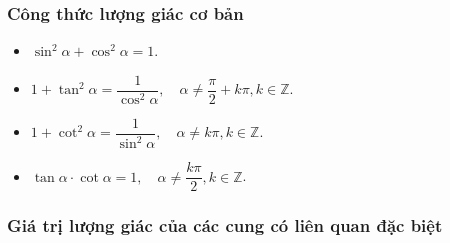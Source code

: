 \subsubsection{Công thức lượng giác cơ bản}
\begin{itemize}
\item $\sin ^2 \alpha + \cos^2 \alpha = 1$.
\item $1+\tan^2 \alpha = \dfrac{1}{\cos^2 \alpha}, \quad \alpha \neq \dfrac{\pi}{2}+k\pi, k \in \mathbb{Z}$.
\item $1+\cot^2 \alpha = \dfrac{1}{\sin^2 \alpha}, \quad \alpha \neq k\pi, k \in \mathbb{Z}$.
\item $\tan \alpha \cdot \cot \alpha = 1, \quad \alpha \neq \dfrac{k\pi}{2}, k \in \mathbb{Z}$.
\end{itemize}
\subsubsection{Giá trị lượng giác của các cung có liên quan đặc biệt}
